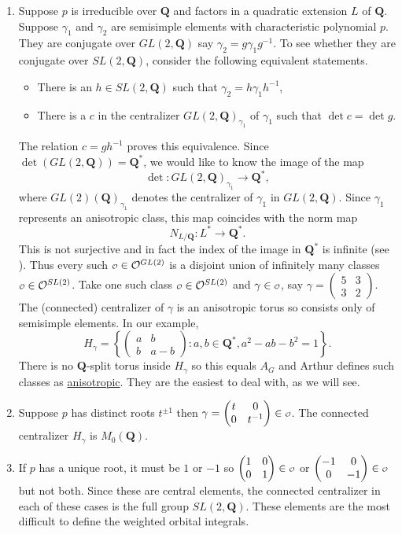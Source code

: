 \documentclass[11pt]{amsart}
\def\Q{\mathbf Q}
\def\O{\mathcal O}
\def\o{\scalebox{0.8}{$\scriptstyle\mathcal{O}$}}
\def\det{\operatorname{det}}
\theoremstyle{remark}
\begin{document}
\begin{enumerate}
	\item Suppose $p$ is irreducible over $\Q$ and factors in a quadratic extension $L$ of $\Q$. Suppose $\gamma_1$ and $\gamma_2$ are semisimple elements with characteristic polynomial $p$. They are conjugate over $GL(2, \Q)$ say $\gamma_2 = g \gamma_1 g^{-1}$. To see whether they are conjugate over $SL(2, \Q)$, consider the following equivalent statements. 
	\begin{itemize}
		\item There is an $h \in SL(2, \Q)$ such that $\gamma_2 = h \gamma_1 h^{-1}$,
		\item There is a $c$ in the centralizer $GL(2, \Q)_{\gamma_1}$ of $\gamma_1$ such that $\det c = \det g$. 
	\end{itemize}
		The relation $c = gh^{-1}$ proves this equivalence. Since $\det(GL(2, \Q)) = \Q^*$, we would like to know the image of the map
    		\[ \det : GL(2, \Q)_{\gamma_1} \to \Q^*, \]
		where $GL(2)(\Q)_{\gamma_1}$ denotes the centralizer of $\gamma_1$ in $GL(2, \Q)$. Since $\gamma_1$ represents an anisotropic class, this map coincides with the norm map
		\[ N_{L/\Q} : L^* \to \Q^*. \]
		This is not surjective and in fact the index of the image in $\Q^*$ is infinite (see \cite{MR1068677}). Thus every such $\o \in \O^{GL(2)}$ is a disjoint union of infinitely many classes $\o \in \O^{SL(2)}$. Take one such class $\o \in \O^{SL(2)}$ and $\gamma \in \o$, say $\gamma = \begin{pmatrix} 5 & 3 \\ 3 & 2 \end{pmatrix}$. The (connected) centralizer of $\gamma$ is an anisotropic torus so consists only of semisimple elements. In our example, 
		\[ H_\gamma = \left\{ \begin{pmatrix} a & b \\ b & a - b \end{pmatrix} : a, b \in \Q^*, a^2 - ab - b^2 = 1 \right\}. \]
		There is no $\Q$-split torus inside $H_\gamma$ so this equals $A_G$ and Arthur defines such classes as \underline{anisotropic}. They are the easiest to deal with, as we will see. 
	\item Suppose $p$ has distinct roots $t^{\pm 1}$ then $\gamma = \begin{pmatrix} t & 0 \\ 0 & t^{-1} \end{pmatrix} \in \o$. The connected centralizer $H_\gamma$ is $M_0(\Q)$. 
	\item If $p$ has a unique root, it must be $1$ or $-1$ so $\begin{pmatrix} 1 & 0 \\ 0 & 1 \end{pmatrix} \in \o$ or $\begin{pmatrix} -1 & 0 \\ 0 & -1 \end{pmatrix} \in \o$ but not both. Since these are central elements, the connected centralizer in each of these cases is the full group $SL(2, \Q)$. These elements are the most difficult to define the weighted orbital integrals. 
\end{enumerate}
\end{document}
